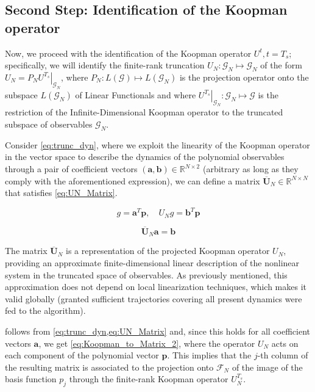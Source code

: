 \documentclass{article}
\begin{document}
    \subsection{Second Step: Identification of the Koopman operator}

        Now, we proceed with the identification of the Koopman operator $U^t , t = T_s$; specifically, we will identify the finite-rank truncation $U_N: \mathcal{G}_N \mapsto \mathcal{G}_N$ of the form $U_N = P_N \left.U^{T_s}\right|_{\mathcal{G}_N}$, where $P_N : L\left(\mathcal{G}\right) \mapsto L\left(\mathcal{G}_N\right)$ is the projection operator onto the subspace $L\left(\mathcal{G}_N\right)$ of Linear Functionals and where $\left.U^{T_s}\right|_{\mathcal{G}_N} : \mathcal{G}_N \mapsto \mathcal{G}$ is the restriction of the Infinite-Dimensional Koopman operator to the truncated subspace of observables $\mathcal{G}_N$.
        
        Consider \cref{eq:trunc_dyn}, where we exploit the linearity of the Koopman operator in the vector space to describe the dynamics of the polynomial observables through a pair of coefficient vectors $\left(\mathbf{a},\mathbf{b}\right) \in \mathbb{R}^{N \times 2}$ (arbitrary as long as they comply with the aforementioned expression), we can define a matrix $\overline{\mathbf{U}}_N \in \mathbb{R}^{N \times N}$ that satisfies \cref{eq:UN_Matrix}.

        \begin{equation} \label{eq:trunc_dyn}
            g = \mathbf{a}^T \mathbf{p} , \quad U_N g = \mathbf{b}^T \mathbf{p}
        \end{equation}

        \begin{equation} \label{eq:UN_Matrix}
            \overline{\mathbf{U}}_N \mathbf{a} = \mathbf{b}
        \end{equation}

        The matrix $\overline{\mathbf{U}}_N$ is a representation of the projected Koopman operator $U_N$, providing an approximate finite-dimensional linear description of the nonlinear system in the truncated space of observables. As previously mentioned, this approximation does not depend on local linearization techniques, which makes it valid globally (granted sufficient trajectories covering all present dynamics were fed to the algorithm).

         follows from \cref{eq:trunc_dyn,eq:UN_Matrix} and, since this holds for all coefficient vectors $\mathbf{a}$, we get \cref{eq:Koopman_to_Matrix_2}, where the operator $U_N$ acts on each component of the polynomial vector $\mathbf{p}$. This implies that the $j$-th column of the resulting matrix is associated to the projection onto $\mathcal{F}_N$ of the image of the basis function $p_j$ through the finite-rank Koopman operator $U_N^{T_s}$.
\end{document}
